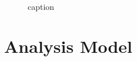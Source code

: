 \documentclass[\docopts]{\docclass}
\begin{document}
\begin{figure}[t]
\begin{center}
\\
\caption{caption}
\label{fig:sigmas}
\end{center}
\end{figure}


\section{Analysis Model}
\label{sec::analysis_model}
\end{document}
